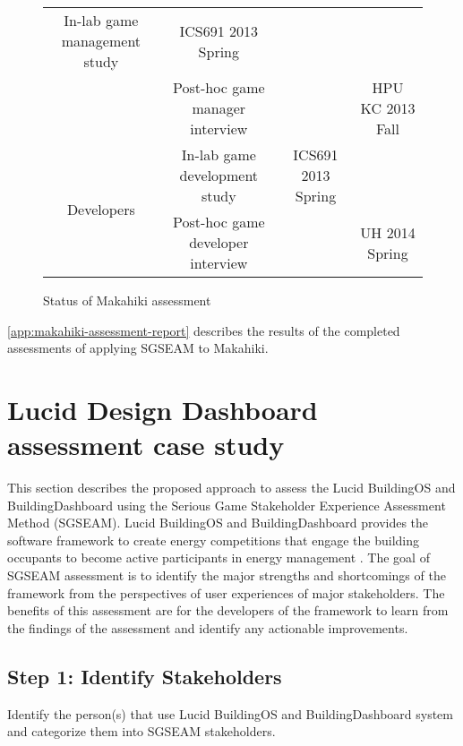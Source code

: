 \begin{figure}[ht!]
\begin{tabular}{|c|c|c|c|}
    \multicolumn{1}{|p{0.2\columnwidth}|}{In-lab game management study} &
    \multicolumn{1}{|p{0.3\columnwidth}|}{ICS691 2013 Spring} &
    \multicolumn{1}{|p{0.2\columnwidth}|}{} \\
    \cline{2-4}
    \multicolumn{1}{|p{0.2\columnwidth}|}{} &
    \multicolumn{1}{|p{0.2\columnwidth}|}{Post-hoc game manager interview} &
    \multicolumn{1}{|p{0.3\columnwidth}|}{} &
    \multicolumn{1}{|p{0.2\columnwidth}|}{HPU KC 2013 Fall} \\
    \hline
    \multicolumn{1}{|p{0.2\columnwidth}|}{\multirow{2}{*}{Developers}} &
    \multicolumn{1}{|p{0.2\columnwidth}|}{In-lab game development study} &
    \multicolumn{1}{|p{0.3\columnwidth}|}{ICS691 2013 Spring} &
    \multicolumn{1}{|p{0.2\columnwidth}|}{} \\
    \cline{2-4}
    \multicolumn{1}{|p{0.2\columnwidth}|}{} &
    \multicolumn{1}{|p{0.2\columnwidth}|}{Post-hoc game developer interview} &
    \multicolumn{1}{|p{0.3\columnwidth}|}{} &
    \multicolumn{1}{|p{0.2\columnwidth}|}{UH 2014 Spring} \\
    \hline
  \end{tabular}
  \caption{Status of Makahiki assessment}
  \label{fig:assessment-overview}
\end{figure}


\autoref{app:makahiki-assessment-report} describes the results of the completed assessments of applying SGSEAM to Makahiki.

\section{Lucid Design Dashboard assessment case study}
This section describes the proposed approach to assess the Lucid BuildingOS and BuildingDashboard using the Serious Game Stakeholder Experience Assessment Method (SGSEAM). Lucid BuildingOS and BuildingDashboard provides the software framework to create energy competitions that engage the building occupants to become active participants in energy management \cite{building-dashboard}. The goal of SGSEAM assessment is to identify the major strengths and shortcomings of the framework from the perspectives of user experiences of major stakeholders. The benefits of this assessment are for the developers of the framework to learn from the findings of the assessment and identify any actionable improvements.

\subsection{Step 1: Identify Stakeholders}
Identify the person(s) that use Lucid BuildingOS and BuildingDashboard system and categorize them into SGSEAM stakeholders.


